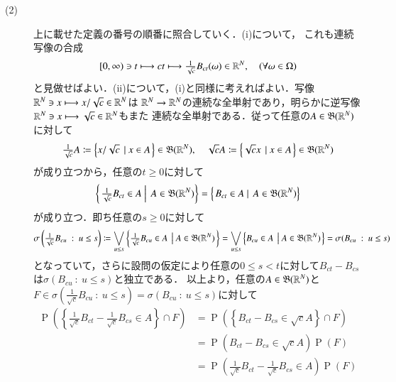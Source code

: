 \begin{prf}
\begin{description}
	\item[(2)] 上に載せた定義の番号の順番に照合していく．(i)について，
		これも連続写像の合成
		\begin{align}
			[0,\infty) \ni t \longmapsto ct \longmapsto \tfrac{1}{\sqrt{c}} B_{ct}(\omega) \in \mathbb{R}^N, \quad(\forall \omega \in \Omega)
		\end{align}
		と見做せばよい．(ii)について，(i)と同様に考えればよい．写像$\mathbb{R}^N \ni x \longmapsto x/\sqrt{c} \in \mathbb{R}^N$は
		$\mathbb{R}^N \rightarrow \mathbb{R}^N$の連続な全単射であり，明らかに逆写像$\mathbb{R}^N \ni x \longmapsto \sqrt{c} \in \mathbb{R}^N$もまた
		連続な全単射である．従って任意の$A \in \mathfrak{B}(\mathbb{R}^N)$に対して
		\begin{align}
			\tfrac{1}{\sqrt{c}} A \coloneqq \left\{ x/\sqrt{c}\ \left|\ x \in A \right.\right\} \in \borel{\R^N}, \quad
			\sqrt{c} A \coloneqq \left\{ \sqrt{c}x\ \left|\ x \in A \right.\right\} \in \borel{\R^N}
		\end{align}
		が成り立つから，任意の$t \geq 0$に対して
		\begin{align}
			\left\{\left. \tfrac{1}{\sqrt{c}}B_{ct} \in A\ \right|\ A \in \mathfrak{B}(\mathbb{R}^N) \right\}
			= \left\{\left. B_{ct} \in A\ \right|\ A \in \mathfrak{B}(\mathbb{R}^N) \right\}
		\end{align}
		が成り立つ．即ち任意の$s \geq 0$に対して
		\begin{align}
			\sigma\left(\tfrac{1}{\sqrt{c}}B_{cu}\ :\ u \leq s\right)
			\coloneqq \bigvee_{u \leq s} \left\{ \tfrac{1}{\sqrt{c}}B_{cu} \in A\ \left|\ A \in \mathfrak{B}(\mathbb{R}^N) \right.\right\}
			= \bigvee_{u \leq s} \left\{ B_{cu} \in A\ \left|\ A \in \mathfrak{B}(\mathbb{R}^N) \right.\right\}
			= \sigma(B_{cu}\ :\ u \leq s)
		\end{align}
		となっていて，さらに設問の仮定により任意の$0 \leq s < t$に対して$B_{ct} - B_{cs}$は$\sigma(B_{cu}\ :\ u \leq s)$と独立である．
		以上より，任意の$A \in \mathfrak{B}(\mathbb{R}^N)$と$F \in \sigma\left(\tfrac{1}{\sqrt{c}}B_{cu}\ :\ u \leq s\right) = \sigma(B_{cu}\ :\ u \leq s)$に対して
		\begin{align}
			\operatorname{P}\left( \left\{ \tfrac{1}{\sqrt{c}}B_{ct} - \tfrac{1}{\sqrt{c}}B_{cs} \in A \right\} \cap F \right)
			&= \operatorname{P}\left( \left\{ B_{ct} - B_{cs} \in \sqrt{c}A \right\} \cap F \right) \\
			&= \operatorname{P}\left(B_{ct} - B_{cs} \in \sqrt{c}A \right)  \operatorname{P}(F) \\
			&= \operatorname{P}\left(\tfrac{1}{\sqrt{c}}B_{ct} - \tfrac{1}{\sqrt{c}}B_{cs} \in A \right)  \operatorname{P}(F)
		\end{align}

\end{description}
\end{prf}
